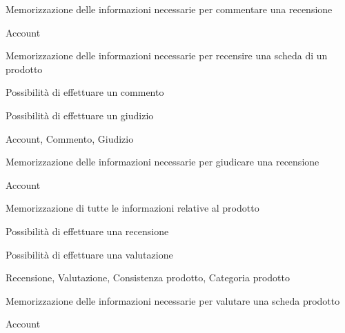 
{\begin{itemWork}
	\item Memorizzazione delle informazioni necessarie per commentare una recensione
\end{itemWork}}
{\begin{itemWork}
	\item Account
\end{itemWork}}


{\begin{itemWork}
	\item Memorizzazione delle informazioni necessarie per recensire una scheda di un prodotto
	\item Possibilità di effettuare un commento
	\item Possibilità di effettuare un giudizio
\end{itemWork}}
{\begin{itemWork}
	\item Account, Commento, Giudizio
\end{itemWork}}


{\begin{itemWork}
	\item Memorizzazione delle informazioni necessarie per giudicare una recensione
\end{itemWork}}
{\begin{itemWork}
	\item Account
\end{itemWork}}


{\begin{itemWork}
	\item Memorizzazione di tutte le informazioni relative al prodotto
	\item Possibilità di effettuare una recensione
	\item Possibilità di effettuare una valutazione
\end{itemWork}}
{\begin{itemWork}
	\item Recensione, Valutazione, Consistenza prodotto, Categoria prodotto
\end{itemWork}}


{\begin{itemWork}
	\item Memorizzazione delle informazioni necessarie per valutare una scheda prodotto
\end{itemWork}}
{\begin{itemWork}
	\item Account
\end{itemWork}}

